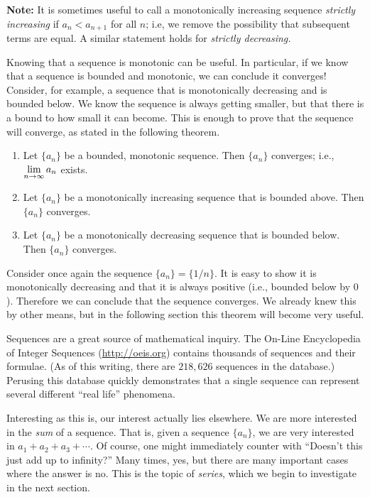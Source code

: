 {\textbf{Note:} It is sometimes useful to call a monotonically increasing sequence \emph{strictly increasing} if $a_n < a_{n+1}$ for all $n$; i.e, we remove the possibility that subsequent terms are equal.  A similar statement holds for \emph{strictly decreasing.}



Knowing that a sequence is monotonic can be useful. In particular, if we know that a sequence is bounded and monotonic, we can conclude it converges! Consider, for example, a sequence that is monotonically decreasing and is bounded below. We know the sequence is always getting smaller, but that there is a bound to how small it can become. This is enough to prove that the sequence will converge, as stated in the following theorem.

{\begin{enumerate}
\item		Let $\{a_n\}$ be a bounded, monotonic sequence. Then $\{a_n\}$ converges; i.e., $\displaystyle \lim_{n \to\infty}a_n$ exists.
\item		Let $\{a_n\}$ be a monotonically increasing sequence that is bounded above. Then $\{a_n\}$ converges.
\item		Let $\{a_n\}$ be a monotonically decreasing sequence that is bounded below. Then $\{a_n\}$ converges.
\end{enumerate}
} %

Consider once again the sequence $\{a_n\} = \{1/n\}$. It is easy to show it is monotonically decreasing and that it is always positive (i.e., bounded below by $0$). Therefore we can conclude that the sequence converges. We already knew this by other means, but in the following section this theorem will become very useful.

Sequences are a great source of mathematical inquiry. The On-Line Encyclopedia of Integer Sequences (\url{http://oeis.org}) contains thousands of sequences and their formulae. (As of this writing, there are $218,626$ sequences in the database.) Perusing this database quickly demonstrates that a single sequence can represent several different ``real life'' phenomena. 

Interesting as this is, our interest actually lies elsewhere. We are more interested in the \emph{sum} of a sequence. That is, given a sequence $\{a_n\}$, we are very interested in $a_1+a_2+a_3+\cdots$. Of course, one might immediately counter with ``Doesn't this just add up to infinity?'' Many times, yes, but there are many important cases where the answer is no. This is the topic of \emph{series}, which we begin to investigate in the next section.



}
